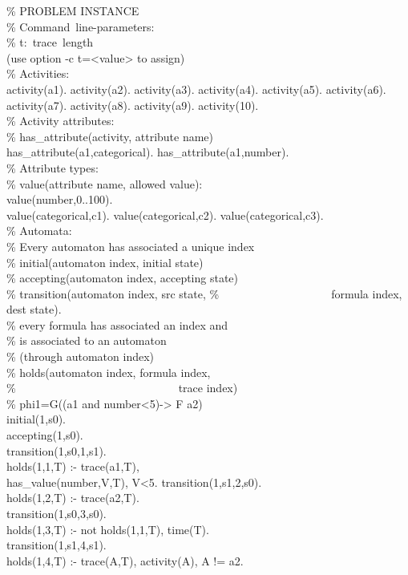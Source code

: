 \begin{small}
\begin{aspcode}
\noindent
\% PROBLEM INSTANCE\\

\noindent
\% Command~line-parameters:\\
\% t:~trace~length\\ 
(use option -c t=<value> to assign)\\

\noindent
\% Activities:\\
activity(a1).
activity(a2).
activity(a3).
activity(a4).
activity(a5).
activity(a6).
activity(a7).
activity(a8).
activity(a9).
activity(10).\\

\noindent
\% Activity attributes:\\ 
\% has\_attribute(activity, attribute name)\\
has\_attribute(a1,categorical).
has\_attribute(a1,number).\\

\noindent 
\% Attribute types:\\ 
\% value(attribute name, allowed value):\\
value(number,0..100).\\
value(categorical,c1). 
value(categorical,c2). 
value(categorical,c3).\\

\noindent
\% Automata:\\
\% Every automaton has associated a unique index\\
\% initial(automaton index, initial state)\\
\% accepting(automaton index, accepting state)\\
\% transition(automaton index, src state, 
\%~~~~~~~~~~~~~~~~~~~~formula index, dest state).\\
\% every formula has associated an index and\\
\% is associated to an automaton\\
\% (through automaton index)\\
\% holds(automaton index, formula index,\\
\%~~~~~~~~~~~~~~~~~~~~~~~~~~~~~trace index)\\

\noindent
\% phi1=G((a1 and number<5)-> F a2)\\
initial(1,s0).\\
accepting(1,s0).\\
transition(1,s0,1,s1).\\
holds(1,1,T) :- trace(a1,T),\\ 
\phantom{holds(1,1,T) :- tra}has\_value(number,V,T), V<5.
transition(1,s1,2,s0).\\
holds(1,2,T) :- trace(a2,T).\\
transition(1,s0,3,s0).\\
holds(1,3,T) :- not holds(1,1,T), time(T).\\
transition(1,s1,4,s1).\\
holds(1,4,T) :- trace(A,T), activity(A), A != a2.\\


\end{aspcode}
\end{small}

